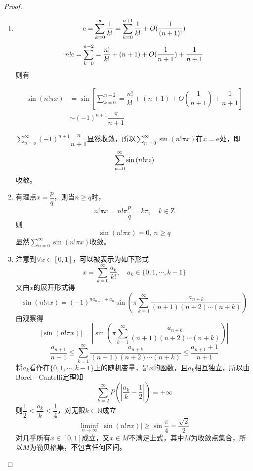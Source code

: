\begin{proof}

    \begin{enumerate}

        \item 
            $$\mathrm{e} = \sum\limits_{k=0}^{\infty}{\dfrac{1}{k!}} = \sum\limits_{k=0}^{n+1}{\dfrac{1}{k!}} + O(\dfrac{1}{(n+1)!})$$
            $$n! \mathrm{e} = \sum\limits_{k=0}^{n-2} = \dfrac{n!}{k!} + (n+1) + O(\dfrac{1}{n + 1}) + \dfrac{1}{n + 1}$$
            则有

            \begin{align*}
                \sin{(n!\pi x)} & = \sin{\left[\sum\limits_{k=0}^{n-2} = \dfrac{n!}{k!} + (n+1) + O(\dfrac{1}{n + 1}) + \dfrac{1}{n + 1}\right]} \\
                & \sim (-1)^{n+1} \dfrac{\pi}{n+1}
            \end{align*}
            
            $\sum\limits_{n=o}^{\infty}{(-1)^{n+1} \dfrac{\pi}{n+1}}$显然收敛，所以$\sum\limits_{n=0}^{\infty}{\sin{(n!\pi x)}}$在$x= \mathrm{e}$处，即
            $$\sum\limits_{n=0}^{\infty}{\sin{(n!\pi \mathrm{e})}}$$
            收敛。
        
        \item 
            有理点$x = \dfrac{p}{q}$，则当$n \geq q$时，
            $$n!\pi x = n! \pi \dfrac{p}{q} = k\pi,\quad k \in \mathrm{Z}$$
            则
            $$\sin{(n!\pi x)} = 0, \ n \geq q$$
            显然$\sum\limits_{n=0}^{\infty}{\sin{(n!\pi x)}}$收敛。

        \item 
            注意到$\forall x \in [0,1]$，可以被表示为如下形式
            $$x = \sum\limits_{k=0}^{\infty}{\dfrac{a_k}{k!}}, \quad a_k \in \{0, 1, \cdots, k-1\}$$
            又由$x$的展开形式得
            $$\sin{(n!\pi x)} = (-1)^{na_{n-1} + a_n} \sin{\left(\pi \sum\limits_{k=1}^{\infty}{\dfrac{a_{n+k}}{(n+1)(n+2) \cdots(n+k)}}\right)}$$
            由观察得
            $$ |\sin{(n!\pi x)}| = \left| \sin{\left(\pi \sum\limits_{k=1}^{\infty}{\dfrac{a_{n+k}}{(n+1)(n+2) \cdots(n+k)}}\right)} \right|$$
            $$\dfrac{a_{n+1}}{n+1} \leq \sum\limits_{k=1}^{\infty}{\dfrac{a_{n+k}}{(n+1)(n+2) \cdots (n+k)}} \leq \dfrac{a_{n+1} + 1}{n+1} $$
            将$a_k$看作在$\{0, 1, \cdots, k-1\}$上的随机变量，是$x$的函数，且$a_k$相互独立，所以由\textup{Borel - Cantelli}定理知
            $$\sum\limits_{k=2}^{\infty}{P \left(\left| \dfrac{a_k}{k} - \dfrac{1}{2} \right| \right)} = +\infty$$
            则$\dfrac{1}{2} < \dfrac{a_k}{k} < \dfrac{1}{4}$，对无限$k \in \mathbb{N}$成立
            $$\liminf_{n\to\infty}{|\sin{(n!\pi x)}|} \geq \sin{\dfrac{\pi}{4}} = \dfrac{\sqrt{2}}{2}$$
            对几乎所有$x \in [0,1]$成立，又$x \in M$不满足上式，其中$M$为收敛点集合，所以$M$为勒贝格集，不包含任何区间。

       \end{enumerate}

\end{proof}

